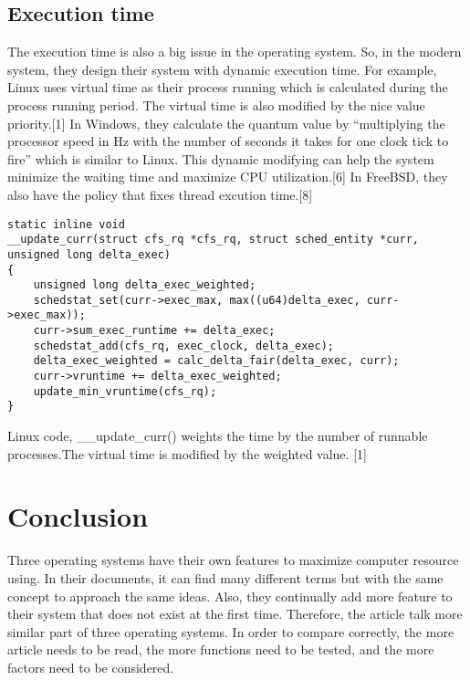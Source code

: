 \documentclass[letterpaper,draftclsnofoot,journal,compsoc,10pt,onecolumn]{IEEEtran}
\begin{document}
\subsection{Execution time}
\indent The execution time is also a big issue in the operating system. So, in the modern system, they design their system with dynamic execution time. For example, Linux uses virtual time as their process running which is calculated during the process running period. The virtual time is also modified by the nice value priority.[1] In Windows, they calculate the quantum value by “multiplying the processor speed in Hz with the number of seconds it takes for one clock tick to fire” which is similar to Linux. This dynamic modifying can help the system minimize the waiting time and maximize CPU utilization.[6] In FreeBSD, they also have the policy that fixes thread excution time.[8] \\

\begin{lstlisting}[style=CStyle] 
static inline void
__update_curr(struct cfs_rq *cfs_rq, struct sched_entity *curr, unsigned long delta_exec)
{
    unsigned long delta_exec_weighted;
    schedstat_set(curr->exec_max, max((u64)delta_exec, curr->exec_max));
    curr->sum_exec_runtime += delta_exec;
    schedstat_add(cfs_rq, exec_clock, delta_exec);
    delta_exec_weighted = calc_delta_fair(delta_exec, curr);
    curr->vruntime += delta_exec_weighted;
    update_min_vruntime(cfs_rq);
}
\end{lstlisting}
Linux code, \_\_update\_curr() weights the time by the number of runnable processes.The virtual time is modified by the weighted value. [1]


\section{Conclusion}
\indent Three operating systems have their own features to maximize computer resource using. In their documents, it can find many different terms but with the same concept to approach the same ideas. Also, they continually add more feature to their system that does not exist at the first time. Therefore, the article talk more similar part of three operating systems. In order to compare correctly, the more article needs to be read, the more functions need to be tested, and the more factors need to be considered.
   
\end{document}
